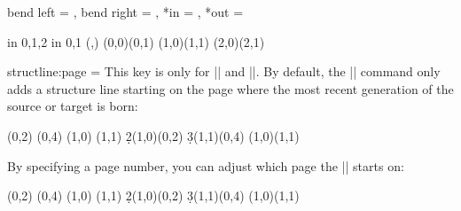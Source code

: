 \begin{sseqdata}[name = basic, cohomological Serre grading]
\begin{keylist}{%
    bend left = , bend right = ,%
    *in = , *out = %
}%
\begin{codeexample}[width = 6cm]
\begin{sseqpage}[no axes,yscale = 1.6]
\foreach \x in {0,1,2} \foreach \y in {0,1} {
    \class(\x,\y)
}
\structline[bend left = 20](0,0)(0,1)
\structline[bend right = 20](1,0)(1,1)
\structline[in = 20, out = north](2,0)(2,1)
\end{sseqpage}
\end{codeexample}
\end{keylist}

%
%

\begin{key}{structline:page = }%
This key is only for |\structline| and |\structlineoptions|. By default, the
|\structline| command only adds a structure line starting on the page where the
most recent generation of the source or target is born:

\begin{codeexample}[width = 7.6cm]
\begin{sseqdata}[ name = structpage example,
                  title = \page, yscale = 0.53 ]
\class(0,2)
\class(0,4)
\class(1,0)
\class(1,1)
\d2(1,0)(0,2) \replacesource
\d3(1,1)(0,4) \replacesource
\structline(1,0)(1,1)
\end{sseqdata}
\printpage[name = structpage example,page = 3]
\qquad
\printpage[name = structpage example,page = 4]
\end{codeexample}

By specifying a page number, you can adjust which page the |\structline| starts
on:

\begin{codeexample}[]
\begin{sseqdata}[ name = structpage example2, title = \page, yscale = 0.5 ]
\class(0,2)
\class(0,4)
\class(1,0)
\class(1,1)
\d2(1,0)(0,2) \replacesource
\d3(1,1)(0,4) \replacesource
\structline[structline:page = 2](1,0)(1,1)
\end{sseqdata}
\printpage[ name = structpage example2, page = 1 ]
\qquad
\printpage[ name = structpage example2, page = 2 ]
\qquad
\printpage[ name = structpage example2, page = 3 ]
\qquad
\printpage[ name = structpage example2, page = 4 ]
\end{codeexample}


\end{key}
\end{sseqdata}
